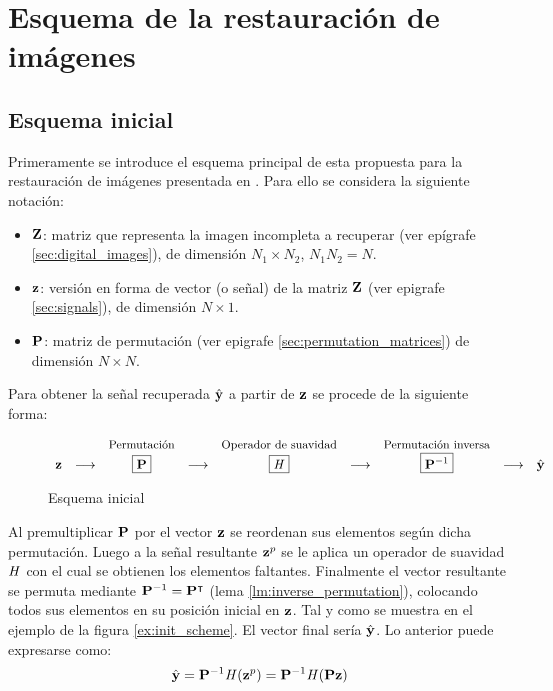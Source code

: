 \chapter{Esquema de la restauraci\'on de im\'agenes}\label{chapter:scheme}

\section{Esquema inicial}
Primeramente se introduce el esquema principal de esta propuesta para la restauraci\'on de im\'agenes presentada en \cite{ram2013image}. Para ello se considera la siguiente notaci\'on:
\begin{itemize}
	\item $\Z$: matriz que representa la imagen incompleta a recuperar (ver epígrafe \ref{sec:digital_images}), de dimensi\'on $N_1 \times N_2$, $N_1N_2 = N$.
	\item $\z$: versión en forma de vector (o señal) de la matriz $\Z$ (ver epigrafe \ref{sec:signals}), de dimensi\'on $N \times 1$.
	\item $\P$: matriz de permutaci\'on (ver epigrafe \ref{sec:permutation_matrices}) de dimensi\'on $N \times N$.
\end{itemize}
Para obtener la señal recuperada $\yhat$ a partir de $\z$ se procede de la siguiente forma:
\begin{figure}[H]
	\centering
	\begin{equation*}
		\begin{array}[t]{ccccccccc}
			& & \mbox{\small{Permutaci\'on}} & & \mbox{\small{Operador de suavidad}} & & \mbox{\small{Permutaci\'on inversa}} & &\\
			\z & \longrightarrow & \boxed{\P} & \longrightarrow & \boxed{\H} & \longrightarrow & \boxed{\P^{-1}} & \longrightarrow & \yhat \\
		\end{array}
	\end{equation*}
	\caption{Esquema inicial}
	\label{fig:init_scheme}
\end{figure}

Al premultiplicar $\P$ por el vector $\z$ se reordenan sus elementos seg\'un dicha permutaci\'on. Luego a la señal resultante $\z^p$ se le aplica un operador de suavidad $\H$ con el cual se obtienen los elementos faltantes. Finalmente el vector resultante se permuta mediante $\P^{-1}=\P^\intercal$ (lema \ref{lm:inverse_permutation}), colocando todos sus elementos en su posici\'on inicial en $\z$. Tal y como se muestra en el ejemplo de la figura \ref{ex:init_scheme}. El vector final ser\'ia $\yhat$. Lo anterior puede expresarse como:
\begin{equation}
	\yhat = \P^{-1}\H(\z^p) = \P^{-1}\H(\P\z)
	\label{eq:init_yhat}
\end{equation}

